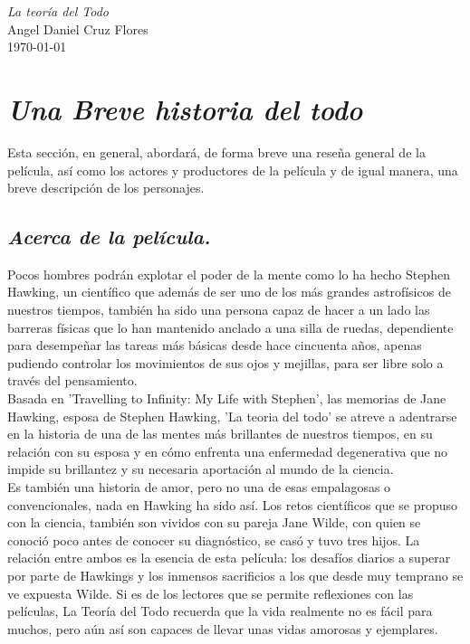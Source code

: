 \documentclass[a5paper, 11pt]{article}
\begin{document}
\begin{center}

\vspace{2cm}

    \LARGE{\emph{La teoría del Todo}}\\[0.3cm]
    \small{Angel Daniel Cruz Flores}\\
    \small{\today}\\[1.2cm]

\end{center}


\section{\large{\emph{Una Breve historia del todo}}}

\small{
Esta sección, en general, abordará, de forma breve una reseña general de la película, así como los actores y productores de la película y de igual manera, una breve descripción de los personajes.
}

    \subsection{\emph{\normalsize{Acerca de la película.}}}
    
    \small{
    Pocos hombres podrán explotar el poder de la mente como lo ha hecho Stephen Hawking, un científico que además de ser uno de los más grandes astrofísicos de nuestros tiempos, también ha sido una persona capaz de hacer a un lado las barreras físicas que lo han mantenido anclado a una silla de ruedas, dependiente para desempeñar las tareas más básicas desde hace cincuenta años, apenas pudiendo controlar los movimientos de sus ojos y mejillas, para ser libre solo a través del pensamiento.\\
    
    Basada en 'Travelling to Infinity: My Life with Stephen', las memorias de Jane Hawking, esposa de Stephen Hawking, 'La teoria del todo' se atreve a adentrarse en la historia de una de las mentes más brillantes de nuestros tiempos, en su relación con su esposa y en cómo enfrenta una enfermedad degenerativa que no impide su brillantez y su necesaria aportación al mundo de la ciencia.\\
    
    Es también una historia de amor, pero no una de esas empalagosas o convencionales, nada en Hawking ha sido así. Los retos científicos que se propuso con la ciencia, también son vividos con su pareja Jane Wilde, con quien se conoció poco antes de conocer su diagnóstico, se casó y tuvo tres hijos. La relación entre ambos es la esencia de esta película: los desafíos diarios a superar por parte de Hawkings y los inmensos sacrificios a los que desde muy temprano se ve expuesta Wilde. Si es de los lectores que se permite reflexiones con las películas, La Teoría del Todo recuerda que la vida realmente no es fácil para muchos, pero aún así son capaces de llevar unas vidas amorosas y ejemplares.
    }
    
\end{document}
